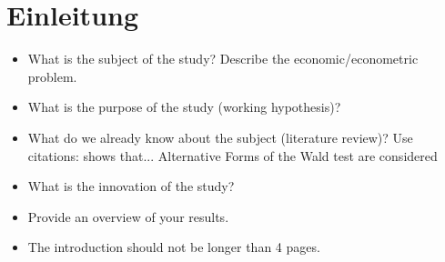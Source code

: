 \section{Einleitung}

\begin{itemize}

    \item What is the subject of the study? Describe the
        economic/econometric problem.

    \item What is the purpose of the study (working hypothesis)?

    \item What do we already know about the subject (literature
        review)? Use citations: shows that...
        Alternative Forms of the Wald test are considered

    \item What is the innovation of the study?

    \item Provide an overview of your results.


    \item The introduction should not be longer than 4 pages.
    

\end{itemize}

